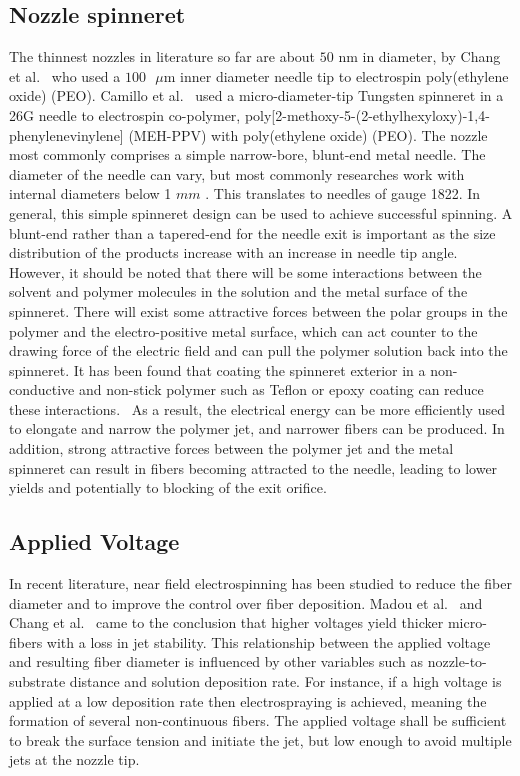 \subsection{Nozzle spinneret}The thinnest nozzles in literature so far are about $50 \textrm{ nm}$ in diameter, by Chang et al.\unskip~\cite{527120:11974306} who used a  $100 \textrm{ } \mu \textrm{m}$ inner diameter needle tip to electrospin poly(ethylene oxide) (PEO). Camillo et al.\unskip~\cite{527120:12322072} used a micro-diameter-tip Tungsten spinneret in a 26G needle to electrospin co-polymer, poly[2-methoxy-5-(2-ethylhexyloxy)-1,4-phenylenevinylene] (MEH-PPV) with poly(ethylene oxide) (PEO). The nozzle most commonly comprises a simple narrow-bore, blunt-end metal needle. The diameter of the needle can vary, but most commonly researches work with internal diameters below 1 $mm $ . This translates to needles of gauge 18{\textendash}22. In general, this simple spinneret design can be used to achieve successful spinning. A blunt-end rather than a tapered-end for the needle exit is important as the size distribution of the products increase with an increase in needle tip angle. However, it should be noted that there will be some interactions between the solvent and polymer molecules in the solution and the metal surface of the spinneret. There will exist some attractive forces between the polar groups in the polymer and the electro-positive metal surface, which can act counter to the drawing force of the electric field and can pull the polymer solution back into the spinneret. It has been found that coating the spinneret exterior in a non-conductive and non-stick polymer such as Teflon or epoxy coating can reduce these interactions.\unskip~\cite{527120:13082768,527120:13082811} As a result, the electrical energy can be more efficiently used to elongate and narrow the polymer jet, and narrower fibers can be produced. In addition, strong attractive forces between the polymer jet and the metal spinneret can result in fibers becoming attracted to the needle, leading to lower yields and potentially to blocking of the exit orifice.



\subsection{Applied Voltage}In recent literature, near field electrospinning has been studied to reduce the fiber diameter and to improve the control over fiber deposition. Madou et al.\unskip~\cite{527120:11973130} and Chang et al.\unskip~\cite{527120:11974306} came to the conclusion that higher voltages yield thicker micro-fibers with a loss in jet stability. This relationship between the applied voltage and resulting fiber diameter is influenced by other variables such as nozzle-to-substrate distance and solution deposition rate. For instance, if a high voltage is applied at a low deposition rate then electrospraying is achieved, meaning the formation of several non-continuous fibers. The applied voltage shall be sufficient to break the surface tension and initiate the jet, but low enough to avoid multiple jets at the nozzle tip.

